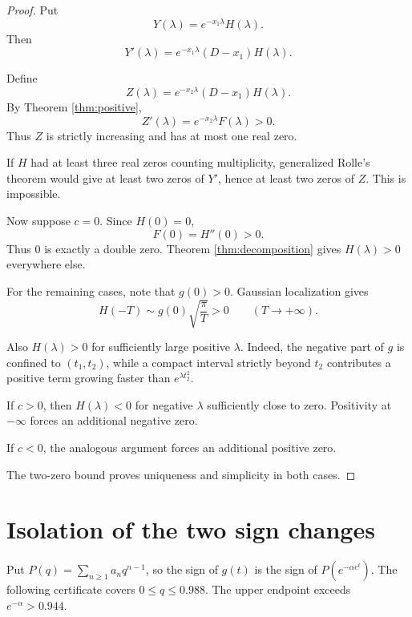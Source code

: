 \documentclass[11pt]{article}
\begin{document}
\begin{proof}
Put
\[
Y(\lambda)=e^{-x_1\lambda}H(\lambda).
\]
Then
\[
Y'(\lambda)=e^{-x_1\lambda}(D-x_1)H(\lambda).
\]

Define
\[
Z(\lambda)=
e^{-x_2\lambda}(D-x_1)H(\lambda).
\]
By Theorem \ref{thm:positive},
\[
Z'(\lambda)=e^{-x_2\lambda}F(\lambda)>0.
\]
Thus $Z$ is strictly increasing and has
at most one real zero.

If $H$ had at least three real zeros
counting multiplicity, generalized Rolle's
theorem would give at least two zeros
of $Y'$, hence at least two zeros of $Z$.
This is impossible.

Now suppose $c=0$. Since $H(0)=0$,
\[
F(0)=H''(0)>0.
\]
Thus $0$ is exactly a double zero.
Theorem \ref{thm:decomposition} gives
$H(\lambda)>0$ everywhere else.

For the remaining cases, note that
$g(0)>0$. Gaussian localization gives
\[
H(-T)\sim g(0)\sqrt{\frac{\pi}{T}}>0
\qquad(T\to+\infty).
\]

Also $H(\lambda)>0$ for sufficiently
large positive $\lambda$. Indeed, the
negative part of $g$ is confined to
$(t_1,t_2)$, while a compact interval
strictly beyond $t_2$ contributes a
positive term growing faster than
$e^{\lambda t_2^2}$.

If $c>0$, then $H(\lambda)<0$ for
negative $\lambda$ sufficiently close
to zero. Positivity at $-\infty$
forces an additional negative zero.

If $c<0$, the analogous argument
forces an additional positive zero.

The two-zero bound proves uniqueness
and simplicity in both cases.
\end{proof}

\section{Isolation of the two sign changes}

Put $P(q)=\sum_{n\ge1}a_nq^{n-1}$, so the sign of $g(t)$ is the
sign of $P(e^{-\alpha e^t})$. The following certificate covers
$0\le q\le0.988$. The upper endpoint exceeds $e^{-\alpha}>0.944$.
\end{document}
